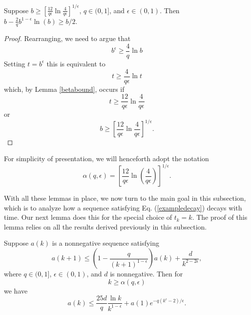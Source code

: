\documentclass[final]{siamltex}
\begin{document}
\smallskip

\begin{lemma} Suppose $b \geq \left[ \frac{12}{q\epsilon} \ln \frac{4}{q\epsilon} \right]^{1/\epsilon}$, $q \in (0,1]$, and $\epsilon \in (0,1)$. Then $b - \frac{2}{q} b^{1-\epsilon} \ln(b) \geq b/2$. 
\label{halflemma}
\end{lemma} 
\begin{proof} Rearranging, we need to argue that 
\[ b^{\epsilon} \geq \frac{4}{q} \ln b \] Setting $t = b^{\epsilon}$ this is equivalent to 
\[ t \geq \frac{4}{q \epsilon} \ln t \] which, by Lemma \ref{betabound}, occurs if 
\[ t \geq \frac{12}{q\epsilon} \ln \frac{4}{q\epsilon} \] or 
\[ b \geq \left[ \frac{12}{q\epsilon} \ln \frac{4}{q\epsilon} \right]^{1/\epsilon}.\]
\end{proof}

\smallskip

For simplicity of presentation, we will henceforth adopt the notation \[ \alpha(q,\epsilon) =  \left[ \frac{12}{q \epsilon} \ln \left( \frac{4}{q \epsilon} \right) \right]^{1/\epsilon}. \] 

\smallskip

\smallskip With all these lemmas in place, we now turn to the main goal in this subsection, which is to analyze how a sequence satisfying
Eq. (\ref{exampledecay}) decays with time. Our next lemma does this for the special choice of $t_k=k$. The proof of this lemma relies on 
all the results derived previously in this subsection.

\smallskip

\begin{lemma} \label{decay} Suppose $a(k)$ is a nonnegative sequence satisfying \[ a({k+1}) \leq \left( 1 - \frac{q}{(k+1)^{1-\epsilon}} \right) a(k) + \frac{d}{k^{2 - 2 \epsilon}},\] where $q \in (0,1]$, $ \epsilon \in (0,1)$,  and $d$
  is nonnegative.  
Then for \[ k \geq \alpha(q,\epsilon) \] we have \[ a(k) \leq \frac{25d}{q} \frac{\ln k}{ k^{1 - \epsilon}}  + a(1) e^{-q(k^\epsilon - 2)/\epsilon}. \]
\label{decay0}
\end{lemma}

\smallskip
\end{document}
